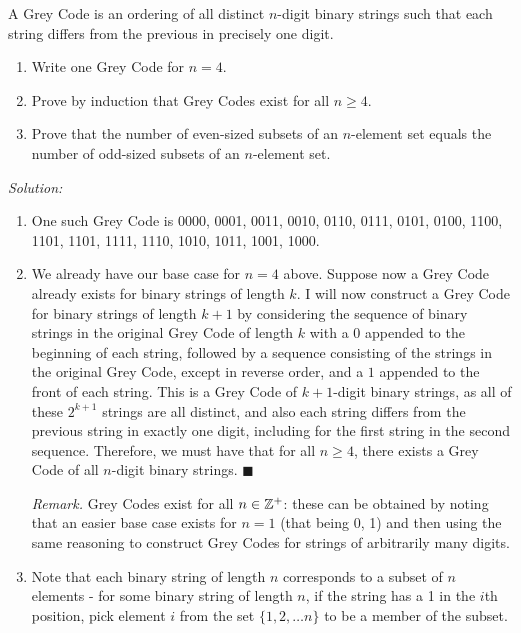 \documentclass[12pt]{scrartcl}
\newenvironment{problem}[2][Problem]{\begin{trivlist}
\item[\hskip \labelsep {\bfseries #1}\hskip \labelsep {\bfseries #2.}]}{\end{trivlist}}
\newenvironment{solution}
    {\emph{Solution:}
    }
    {
    \qedhere
    }
\begin{document}
\begin{problem}{3}
A Grey Code is an ordering of all distinct $n$-digit binary strings such that each string differs from the previous in precisely one digit. 
\begin{enumerate}[label=(\alph*)]
\item Write one Grey Code for $n=4$. 
\item Prove by induction that Grey Codes exist for all $n \geq 4$. 
\item Prove that the number of even-sized subsets of an $n$-element set equals the number of odd-sized subsets of an $n$-element set. 
\end{enumerate}
\end{problem}

\begin{solution}
\begin{enumerate}[label=(\alph*)]
\item One such Grey Code is 0000, 0001, 0011, 0010, 0110, 0111, 0101, 0100, 1100, 1101, 1101, 1111, 1110, 1010, 1011, 1001, 1000. 
\item We already have our base case for $n = 4$ above. Suppose now a Grey Code already exists for binary strings of length $k$. I will now construct a Grey Code for binary strings of length $k+1$ by considering the sequence of binary strings in the original Grey Code of length $k$ with a $0$ appended to the beginning of each string, followed by a sequence consisting of the strings in the original Grey Code, except in reverse order, and a $1$ appended to the front of each string. This is a Grey Code of $k+1$-digit binary strings, as all of these $2^{k+1}$ strings are all distinct, and also each string differs from the previous string in exactly one digit, including for the first string in the second sequence. Therefore, we must have that for all $n \geq 4$, there exists a Grey Code of all $n$-digit binary strings. $\blacksquare$

\textit{Remark.} Grey Codes exist for all $n \in \mathbb Z^+$: these can be obtained by noting that an easier base case exists for $n = 1$ (that being 0, 1) and then using the same reasoning to construct Grey Codes for strings of arbitrarily many digits. 
\item Note that each binary string of length $n$ corresponds to a subset of $n$ elements - for some binary string of length $n$, if the string has a 1 in the $i$th position, pick element $i$ from the set $\{ 1, 2, \ldots n\}$ to be a member of the subset. 


\end{enumerate}
\end{solution}
\end{document}
